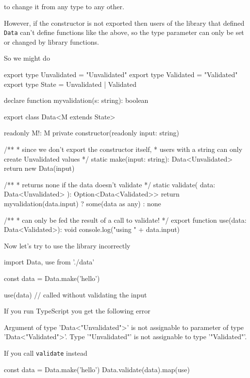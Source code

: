 \documentclass[12pt]{article}
\theoremstyle{definition}
\newenvironment{code}
  {\vspace{0.5cm} \VerbatimEnvironment\begin{typescriptcode}}
  {\end{typescriptcode} \vspace{0.2cm}}
\begin{document}
to change it from any type to any other.

However, if the constructor is not exported then users of the library that defined \texttt{Data} can't define functions like the above,
so the type parameter can only be set or changed by library functions.

So we might do

\begin{code}
export type Unvalidated = "Unvalidated"
export type Validated = "Validated"
export type State = Unvalidated | Validated

declare function myvalidation(s: string): boolean

export class Data<M extends State> {
  readonly M!: M
  private constructor(readonly input: string) {}

  /**
   * since we don't export the constructor itself,
   * users with a string can only create Unvalidated values
   */
  static make(input: string): Data<Unvalidated> {
    return new Data(input)
  }

  /**
   * returns none if the data doesn't validate
   */
  static validate(
    data: Data<Unvalidated>
  ): Option<Data<Validated>> {
    return myvalidation(data.input)
      ? some(data as any)
      : none
  }
}

/**
 * can only be fed the result of a call to validate!
 */
export function use(data: Data<Validated>): void {
  console.log("using " +  data.input)
}
\end{code}

Now let's try to use the library incorrectly

\begin{code}
import { Data, use } from './data'

const data = Data.make('hello')

use(data) // called without validating the input
\end{code}

If you run TypeScript you get the following error

\begin{code}
[ts]
Argument of type 'Data<"Unvalidated">' is not assignable
  to parameter of type 'Data<"Validated">'.
  Type '"Unvalidated"' is not assignable to type '"Validated"'.
\end{code}

If you call \texttt{validate} instead

\begin{code}
const data = Data.make('hello')
Data.validate(data).map(use)
\end{code}
\end{document}

